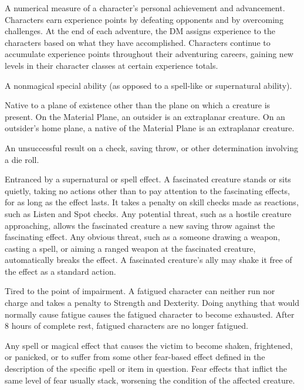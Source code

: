  A numerical measure of a character's 
personal achievement and advancement. Characters earn experience 
points by defeating opponents and by overcoming challenges. At 
the end of each adventure, the DM assigns experience to the 
characters based on what they have accomplished. Characters 
continue to accumulate experience points throughout their 
adventuring careers, gaining new levels in their character classes at 
certain experience totals. 

 A nonmagical special ability (as 
opposed to a spell-like or supernatural ability). 

 Native to a plane of existence other than the plane 
on which a creature is present. On the Material Plane, an outsider is 
an extraplanar creature. On an outsider's home plane, a native of the 
Material Plane is an extraplanar creature. 

 An unsuccessful result on a check, saving throw, or other 
determination involving a die roll. 

 Entranced by a supernatural or spell effect. A fascinated creature stands or sits quietly, taking no actions other than to 
pay attention to the fascinating effects, for as long as the effect lasts. 
It takes a  penalty on skill checks made as reactions, such as Listen 
and Spot checks. Any potential threat, such as a hostile creature 
approaching, allows the fascinated creature a new saving throw 
against the fascinating effect. Any obvious threat, such as a someone 
drawing a weapon, casting a spell, or aiming a ranged weapon at the 
fascinated creature, automatically breaks the effect. A fascinated 
creature's ally may shake it free of the effect as a standard action. 

 Tired to the point of impairment. A fatigued character 
can neither run nor charge and takes a  penalty to Strength and 
Dexterity. Doing anything that would normally cause fatigue causes 
the fatigued character to become exhausted. After 8 hours of 
complete rest, fatigued characters are no longer fatigued. 

 Any spell or magical effect that causes the victim to 
become shaken, frightened, or panicked, or to suffer from some 
other fear-based effect defined in the description of the specific spell 
or item in question. Fear effects that inflict the same level of fear usually stack, worsening the condition of the affected creature.

